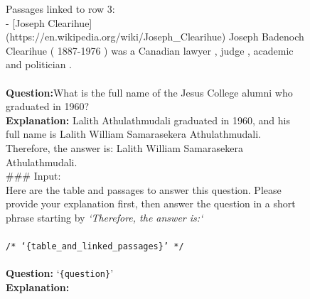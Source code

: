 \begin{figure}[htb]
\begin{tcolorbox}
{Passages linked to row 3: \\
- [Joseph Clearihue](https://en.wikipedia.org/wiki/Joseph\_Clearihue) Joseph Badenoch Clearihue ( 1887-1976 ) was a Canadian lawyer , judge , academic and politician . \\
}
\\
\textbf{Question:}What is the full name of the Jesus College alumni who graduated in 1960? \\
\textbf{Explanation:} Lalith Athulathmudali graduated in 1960, and his full name is Lalith William Samarasekera Athulathmudali. Therefore, the answer is: Lalith William Samarasekera Athulathmudali.
\\
\#\#\# Input: \\
Here are the table and passages to answer this question. Please provide your explanation first, then
answer the question in a short phrase starting by \textit{`Therefore, the answer is:`}
\\
 \\
\texttt{/* `{\texttt{\{table\_and\_linked\_passages\}}}' */} \\
 \\
\textbf{Question:} `{\texttt{\{question\}}}' \\
\textbf{Explanation:}

\end{tcolorbox}
\label{fig:passage_verification}
\end{figure}